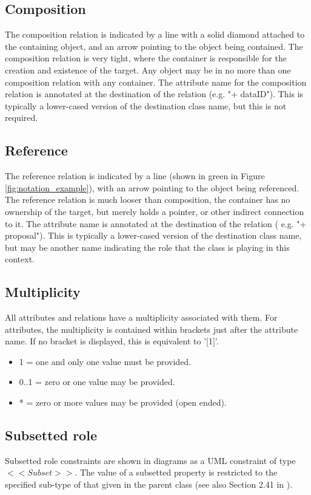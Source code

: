   \subsection{Composition}
  \label{sect:Composition}
  The composition relation is indicated by a line with a solid diamond attached to the
containing object, and an arrow pointing to the object being contained. The composition relation is
very tight, where the container is responsible for the creation and existence of the target. Any
object may be in no more than one composition relation with any container. The attribute name
for the composition relation is annotated at the destination of the relation (e.g. "+ dataID"). This is
typically a lower-cased version of the destination class name, but this is not required.

  \subsection{Reference}
  \label{sect:Reference}
  The reference relation is indicated by a line (shown in green in Figure \ref{fig:notation_example}), with an arrow pointing to the object being
referenced. The reference relation is much looser than composition, the container has no
ownership of the target, but merely holds a pointer, or other indirect connection to it. The
attribute name is annotated at the destination of the relation ( e.g. "+ proposal"). This is typically
a lower-cased version of the destination class name, but may be another name indicating the role
that the class is playing in this context.

  \subsection{Multiplicity}
  \label{sect:Multiplicity}
  All attributes and relations have a multiplicity associated with them. For attributes, the multiplicity
is contained within brackets just after the attribute name. If no bracket is displayed, this is
equivalent to '[1]'.
\begin{itemize}
\item 1 = one and only one value must be provided.
\item 0..1 = zero or one value may be provided.
\item * = zero or more values may be provided (open ended).
\end{itemize}

  \subsection{Subsetted role}
  \label{sect:Subset}
Subsetted role constraints are shown in diagrams as a UML constraint of type $<<Subset>>$. The value of a subsetted property is restricted to the specified sub-type of that given in the parent class (see also Section 2.41 in \citet{2018ivoa.spec.0910L}).
